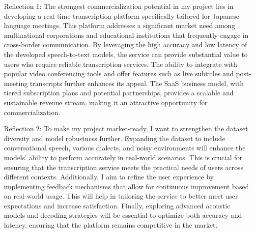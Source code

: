 Reflection 1: The strongest commercialization potential in my project lies in developing a real-time transcription platform specifically tailored for Japanese language meetings. This platform addresses a significant market need among multinational corporations and educational institutions that frequently engage in cross-border communication. By leveraging the high accuracy and low latency of the developed speech-to-text models, the service can provide substantial value to users who require reliable transcription services. The ability to integrate with popular video conferencing tools and offer features such as live subtitles and post-meeting transcripts further enhances its appeal. The SaaS business model, with tiered subscription plans and potential partnerships, provides a scalable and sustainable revenue stream, making it an attractive opportunity for commercialization.

Reflection 2: To make my project market-ready, I want to strengthen the dataset diversity and model robustness further. Expanding the dataset to include conversational speech, various dialects, and noisy environments will enhance the models' ability to perform accurately in real-world scenarios. This is crucial for ensuring that the transcription service meets the practical needs of users across different contexts. Additionally, I aim to refine the user experience by implementing feedback mechanisms that allow for continuous improvement based on real-world usage. This will help in tailoring the service to better meet user expectations and increase satisfaction. Finally, exploring advanced acoustic models and decoding strategies will be essential to optimize both accuracy and latency, ensuring that the platform remains competitive in the market. 